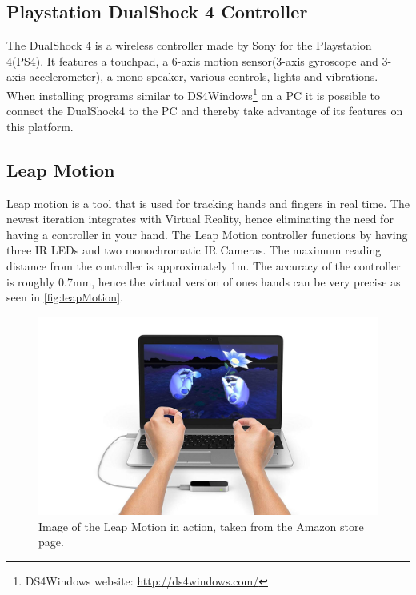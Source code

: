 \subsection{Playstation DualShock 4 Controller}
The DualShock 4 is a wireless controller made by Sony for the Playstation 4(PS4). It features a touchpad, a 6-axis motion sensor(3-axis gyroscope and 3-axis accelerometer), a mono-speaker, various controls, lights and vibrations\cite{dualshock4}. When installing programs similar to DS4Windows\footnote{DS4Windows website: \url{http://ds4windows.com/}} on a PC it is possible to connect the DualShock4 to the PC and thereby take advantage of its features on this platform.

\subsection{Leap Motion} %
    Leap motion is a tool that is used for tracking hands and fingers in real time\cite{leapMotion}. The newest iteration integrates with Virtual Reality, hence eliminating the need for having a controller in your hand. The Leap Motion controller functions by having three IR LEDs and two monochromatic IR Cameras. The maximum reading distance from the controller is approximately 1m\cite{leapMotion}. The accuracy of the controller is roughly 0.7mm, hence the virtual version of ones hands can be very precise as seen in \autoref{fig:leapMotion}.
    
    \begin{figure}[H]
    	\centering
    	\includegraphics[width=0.9\linewidth]{figure/Analysis/leapMotion.jpg}
    	\caption{Image of the Leap Motion in action, taken from the Amazon store page.}
    	\label{fig:leapMotion}
    \end{figure}

